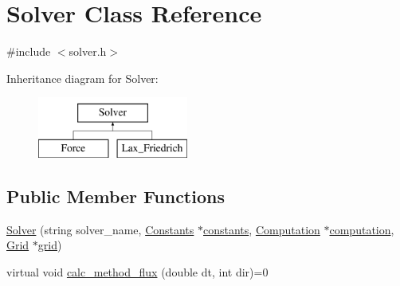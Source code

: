 \hypertarget{classSolver}{\section{Solver Class Reference}
\label{classSolver}
}


{\ttfamily \#include $<$solver.\-h$>$}

Inheritance diagram for Solver\-:\begin{figure}[H]
\begin{center}
\leavevmode
\includegraphics[height=2.000000cm]{classSolver}
\end{center}
\end{figure}
\subsection*{Public Member Functions}
\begin{DoxyCompactItemize}
\item 
\hyperlink{classSolver_a0075747c547c2da8911f2c95bdadaed4}{Solver} (string solver\-\_\-name, \hyperlink{classConstants}{Constants} $\ast$\hyperlink{classSolver_af8791d3a5042e7be5980ae3247cb60de}{constants}, \hyperlink{classComputation}{Computation} $\ast$\hyperlink{classSolver_a158efd10f04099b8be28561f990b646a}{computation}, \hyperlink{classGrid}{Grid} $\ast$\hyperlink{classSolver_a147ba19192faf8f24dadfc569f3d403f}{grid})
\item 
virtual void \hyperlink{classSolver_ab0c03d26d92272de997fa6984a2a86de}{calc\-\_\-method\-\_\-flux} (double dt, int dir)=0
\end{DoxyCompactItemize}
